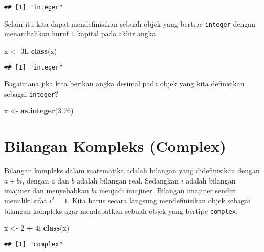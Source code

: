 \documentclass[
]{book}
\newenvironment{Shaded}{\begin{snugshade}}{\end{snugshade}}
\newcommand{\DecValTok}[1]{\textcolor[rgb]{0.00,0.00,0.81}{#1}}
\newcommand{\FloatTok}[1]{\textcolor[rgb]{0.00,0.00,0.81}{#1}}
\newcommand{\KeywordTok}[1]{\textcolor[rgb]{0.13,0.29,0.53}{\textbf{#1}}}
\newcommand{\NormalTok}[1]{#1}
\newcommand{\OperatorTok}[1]{\textcolor[rgb]{0.81,0.36,0.00}{\textbf{#1}}}
\newcommand{\StringTok}[1]{\textcolor[rgb]{0.31,0.60,0.02}{#1}}
\begin{document}
\begin{verbatim}
## [1] "integer"
\end{verbatim}

Selain itu kita dapat mendefinisikan sebuah objek yang bertipe \texttt{integer} dengan menambahkan huruf \texttt{L} kapital pada akhir angka.

\begin{Shaded}
\begin{Highlighting}[]
\NormalTok{x <-}\StringTok{ }\NormalTok{3L}
\KeywordTok{class}\NormalTok{(x)}
\end{Highlighting}
\end{Shaded}

\begin{verbatim}
## [1] "integer"
\end{verbatim}

Bagaimana jika kita berikan angka desimal pada objek yang kita definisikan sebagai \texttt{integer}?

\begin{Shaded}
\begin{Highlighting}[]
\NormalTok{x <-}\StringTok{ }\KeywordTok{as.integer}\NormalTok{(}\FloatTok{3.76}\NormalTok{)}
\end{Highlighting}
\end{Shaded}

\hypertarget{complex}{%
\section{Bilangan Kompleks (Complex)}\label{complex}}

Bilangan kompleks dalam matematika adalah bilangan yang didefinisikan dengan \(a + bi\), dengan \(a\) dan \(b\) adalah bilangan real. Sedangkan \(i\) adalah bilangan imajiner dan menyebabkan \(bi\) menjadi imajiner. Bilangan imajiner sendiri memiliki sifat \(i^{2}=1\). Kita harus secara langsung mendefinisikan objek sebagai bilangan kompleks agar mendapatkan sebuah objek yang bertipe \texttt{complex}.

\begin{Shaded}
\begin{Highlighting}[]
\NormalTok{x <-}\StringTok{ }\DecValTok{2} \OperatorTok{+}\StringTok{ }\NormalTok{4i}
\KeywordTok{class}\NormalTok{(x)}
\end{Highlighting}
\end{Shaded}

\begin{verbatim}
## [1] "complex"
\end{verbatim}
\end{document}

